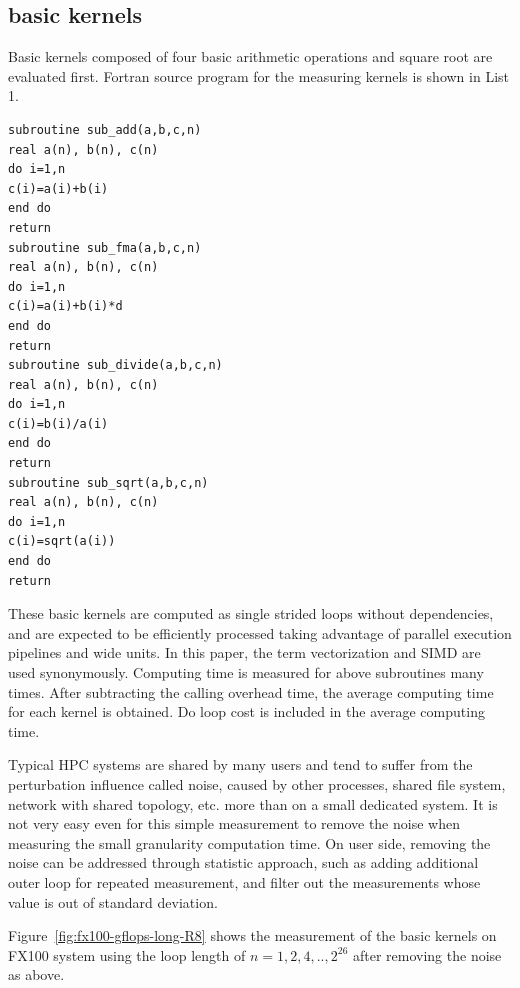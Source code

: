\documentclass[conference]{IEEEtran}
\begin{document}
\begin{table}[tb]
\end{table}

%
\subsection{basic kernels}
\label{subsection:basic-kernels}

Basic kernels composed of four basic arithmetic operations and square root
are evaluated first.
Fortran source program for the measuring kernels is shown in List 1.

\begin{lstlisting}[caption={basic kernels}]
subroutine sub_add(a,b,c,n)
real a(n), b(n), c(n)  
do i=1,n
c(i)=a(i)+b(i)
end do
return
subroutine sub_fma(a,b,c,n)
real a(n), b(n), c(n)  
do i=1,n
c(i)=a(i)+b(i)*d
end do
return
subroutine sub_divide(a,b,c,n)
real a(n), b(n), c(n)  
do i=1,n
c(i)=b(i)/a(i)
end do
return
subroutine sub_sqrt(a,b,c,n)
real a(n), b(n), c(n)  
do i=1,n
c(i)=sqrt(a(i))
end do
return
\end{lstlisting}


These basic kernels are computed as single strided loops without dependencies,
and are expected to be efficiently processed taking advantage of parallel
execution pipelines and wide units.
In this paper, the term vectorization and SIMD are used synonymously.
%
%
Computing time is measured for above subroutines many times.
After subtracting the calling overhead time,
the average computing time for each kernel is obtained.
Do loop cost is included in the average computing time.

Typical HPC systems are shared by many users and tend to suffer from
the perturbation influence called noise, caused by other processes,
shared file system, network with shared topology, etc.
more than on a small dedicated system.
It is not very easy even for this simple measurement to remove the noise
when measuring the small granularity computation time.
On user side, removing the noise can be addressed through statistic approach,
such as
adding additional outer loop for repeated measurement, and filter out
the measurements whose value is out of standard deviation.
\fi

Figure~\ref{fig:fx100-gflops-long-R8} shows the 
measurement of the basic kernels on FX100 system using the loop length of
\begin{math}
n=1,2,4,..,2^{26}
\end{math}
after removing the noise as above.
\end{document}
